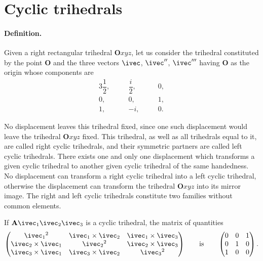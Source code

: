 \section{Cyclic trihedrals}
\label{sec:cyclic-trihedrals}

\paragraph{Definition.}
\label{sec:23}
Given a right rectangular trihedral $\mathbf{O}xyz$, let us consider the trihedral constituted by the point $\mathbf{O}$ and the three vectors $\ivec$, $\ivec''$, $\ivec'''$ having $\mathbf{O}$ as the origin whose components are
\begin{alignat*}{3}  
  \dfrac{1}{2},\quad&&\dfrac{i}{2},\quad&&0,\\
  0,\quad&&0,\quad&&1,\\
  1,\quad&&-i,\quad&&0.
\end{alignat*}

No displacement leaves this trihedral fixed, since one such displacement would leave the trihedral $\mathbf{O}xyz$ fixed. This trihedral, as well as all trihedrals equal to it, are called right cyclic trihedrals, and their symmetric partners are called left cyclic trihedrals. There exists one and only one displacement which transforms a given cyclic trihedral to another given cyclic trihedral of the same handedness. No displacement can transform a right cyclic trihedral into a left cyclic trihedral, otherwise the displacement can transform the trihedral $\mathbf{O}xyz$ into its mirror image. The right and left cyclic trihedrals constitute two families without common elements.

If $\mathbf{A}\ivec_{1}\ivec_{2}\ivec_{3}$ is a cyclic trihedral, the matrix of quantities
\begin{equation}
  \label{eq:2.3}
  \begin{pmatrix}
    \ivec_{1}{}^{2}&\ivec_{1}\times\ivec_{2}&\ivec_{1}\times\ivec_{3}\\
    \ivec_{2}\times\ivec_{1}&\ivec_{2}{}^{2}&\ivec_{2}\times\ivec_{3}\\
    \ivec_{3}\times\ivec_{1}&\ivec_{3}\times\ivec_{2}&\ivec_{3}{}^{2}
  \end{pmatrix}\qquad\text{is}\qquad
  \begin{pmatrix}
    0&0&1\\
    0&1&0\\
    1&0&0
  \end{pmatrix}.
\end{equation}

